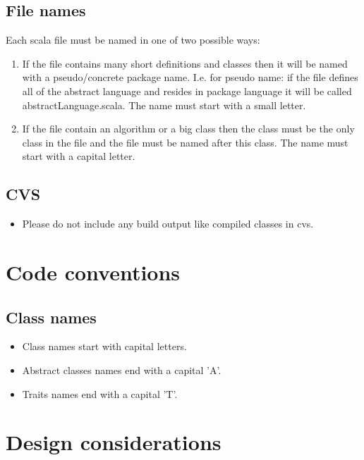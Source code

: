 \documentclass[a4paper, 11pt]{article}
\begin{document}
\subsection{File names}
Each scala file must be named in one of two possible ways:
\begin{enumerate}
 \item If the file contains many short definitions and classes then it will be named with a pseudo/concrete package name. I.e. for pseudo name: if the file defines all of the abstract language and resides in package language it will be called abstractLanguage.scala. The name must start with a small letter. 
 \item If the file contain an algorithm or a big class then the class must be the only class in the file and the file must be named after this class. The name must start with a capital letter.
\end{enumerate}

\subsection{CVS}
\begin{itemize}
 \item Please do not include any build output like compiled classes in cvs.
\end{itemize}


\section{Code conventions}
\subsection{Class names}
\begin{itemize}
 \item Class names start with capital letters.
 \item Abstract classes names end with a capital 'A'.
 \item Traits names end with a capital 'T'.
\end{itemize}

\section{Design considerations}
\end{document}
